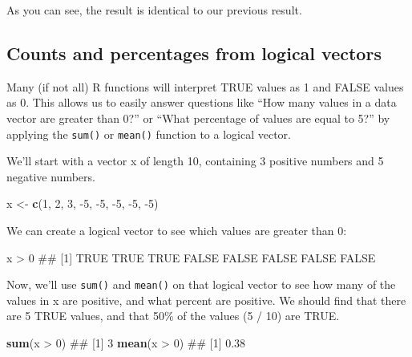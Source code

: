 \documentclass[]{book}
\newenvironment{Shaded}{\begin{snugshade}}{\end{snugshade}}
\newcommand{\KeywordTok}[1]{\textcolor[rgb]{0.13,0.29,0.53}{\textbf{{#1}}}}
\newcommand{\DecValTok}[1]{\textcolor[rgb]{0.00,0.00,0.81}{{#1}}}
\newcommand{\StringTok}[1]{\textcolor[rgb]{0.31,0.60,0.02}{{#1}}}
\newcommand{\NormalTok}[1]{{#1}}
\theoremstyle{definition}
\theoremstyle{definition}
\theoremstyle{remark}
\begin{document}
As you can see, the result is identical to our previous result.

\subsection{Counts and percentages from logical
vectors}\label{counts-and-percentages-from-logical-vectors}

Many (if not all) R functions will interpret TRUE values as 1 and FALSE
values as 0. This allows us to easily answer questions like ``How many
values in a data vector are greater than 0?'' or ``What percentage of
values are equal to 5?'' by applying the \texttt{sum()} or
\texttt{mean()} function to a logical vector.

We'll start with a vector x of length 10, containing 3 positive numbers
and 5 negative numbers.

\begin{Shaded}
\begin{Highlighting}[]
\NormalTok{x <-}\StringTok{ }\KeywordTok{c}\NormalTok{(}\DecValTok{1}\NormalTok{, }\DecValTok{2}\NormalTok{, }\DecValTok{3}\NormalTok{, -}\DecValTok{5}\NormalTok{, -}\DecValTok{5}\NormalTok{, -}\DecValTok{5}\NormalTok{, -}\DecValTok{5}\NormalTok{, -}\DecValTok{5}\NormalTok{)}
\end{Highlighting}
\end{Shaded}

We can create a logical vector to see which values are greater than 0:

\begin{Shaded}
\begin{Highlighting}[]
\NormalTok{x >}\StringTok{ }\DecValTok{0}
\NormalTok{## [1]  TRUE  TRUE  TRUE FALSE FALSE FALSE FALSE FALSE}
\end{Highlighting}
\end{Shaded}

Now, we'll use \texttt{sum()} and \texttt{mean()} on that logical vector
to see how many of the values in x are positive, and what percent are
positive. We should find that there are 5 TRUE values, and that 50\% of
the values (5 / 10) are TRUE.

\begin{Shaded}
\begin{Highlighting}[]
\KeywordTok{sum}\NormalTok{(x >}\StringTok{ }\DecValTok{0}\NormalTok{)}
\NormalTok{## [1] 3}
\KeywordTok{mean}\NormalTok{(x >}\StringTok{ }\DecValTok{0}\NormalTok{)}
\NormalTok{## [1] 0.38}
\end{Highlighting}
\end{Shaded}
\end{document}
